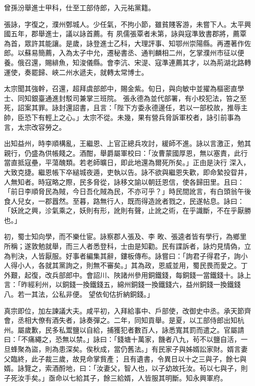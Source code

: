 \begin{pinyinscope}
 曾孫汾舉進士甲科，仕至工部侍郎，入元祐黨籍。



 張詠，字復之，濮州鄄城人。少任氣，不拘小節，雖貧賤客游，未嘗下人。太平興國五年，郡舉進士，議以詠首薦。有
 夙儒張覃者未第，詠與寇準致書郡將，薦覃為首，眾許其能讓。是歲，詠登進士乙科，大理評事、知鄂州崇陽縣。再遷著作佐郎。以蘇易簡薦，入為太子中允，遷秘書丞、通判麟相二州，乞掌濮州市征以便養。俄召還，賜緋魚，知浚儀縣。會李沆、宋湜、寇準連薦其才，以為荊湖北路轉運使，奏罷歸、峽二州水遞夫，就轉太常博士。



 太宗聞其強幹，召還，超拜虞部郎中，賜金紫。旬日，與向敏中並擢為樞密直學士、同知銀臺通進封駁司兼掌三班院。
 張永德為並代部署，有小校犯法，笞之至死，詔案其罪。詠封還詔書，且言：「陛下方委永德邊任，若以一部校故，推辱主帥，臣恐下有輕上之心。」太宗不從。未幾，果有營兵脅訴軍校者，詠引前事為言，太宗改容勞之。



 出知益州，時李順構亂，王繼恩、上官正總兵攻討，緩師不進。詠以言激正，勉其親行，仍盛為供帳餞之。酒酣，舉爵屬軍校曰：「汝曹蒙國厚恩，無以塞責，此行當直抵寇壘，平蕩醜類。若老師曠日，即此地還為爾死所矣。」正由是決行
 深入，大致克捷。繼恩帳下卒縋城夜遁，吏執以告。詠不欲與繼恩失歡，即命縶投眢井，人無知者。時寇略之際，民多脅從，詠移文諭以朝廷恩信，使各歸田里。且曰：「前日李順脅民為賊，今日吾化賊為民，不亦可乎？」時民間訛言，有白頭翁午後食人兒女，一郡囂然。至暮，路無行人，既而得造訛者戮之，民遂帖息。詠曰：「妖訛之興，沴氣乘之，妖則有形，訛則有聲，止訛之術，在乎識斷，不在乎厭勝也。」



 初，蜀士知向學，而不樂仕宦。詠察郡人張及、李
 畋、張逵者皆有學行，為鄉里所稱；遂敦勉就舉，而三人者悉登科，士由是知勸。民有諜訴者，詠灼見情偽，立為判決，人皆厭服。好事者編集其辭，鏤板傳布。詠嘗曰：「詢君子得君子，詢小人得小人，各就其黨詢之，則無不審矣。」其為政，恩威並用，蜀民畏而愛之。丁外艱，起復，改兵部郎中。會詔川、陜諸州參用銅鐵錢，每銅錢一當鐵錢十。詠上言：「昨經利州，以銅錢一換鐵錢五，綿州銅錢一換鐵錢六，益州銅錢一換鐵錢八。若一其法，公私非便。
 望依旬估折納銅錢。」



 真宗即位，加左諫議大夫。咸平初，入拜給事中、戶部使，改御史中丞。承天節齊會，丞相大僚有酒失者，詠奏彈之。二年，同知貢舉。是夏，以工部侍郎出知杭州。屬歲歉，民多私鬻鹽以自給，捕獲犯者數百人，詠悉寬其罰而遣之。官屬請曰：「不痛繩之，恐無以禁。」詠曰：「錢塘十萬家，饑者八九，茍不以鹽自活，一旦蜂聚為盜，則為患深矣。俟秋成，當仍舊法。」有民家子與姊婿訟家財。婿言妻父臨終，此子裁三歲，故見命掌貲產；
 且有遺書，令異日以十之三與子，餘七與婿。詠覽之，索酒酹地，曰：「汝妻父，智人也，以子幼故托汝。茍以七與子，則子死汝手矣。」亟命以七給其子，餘三給婿，人皆服其明斷。知永興軍府。




\end{pinyinscope}
